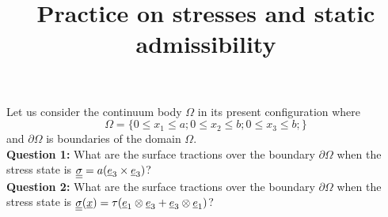 \documentclass[letter,12pt]{article}
\begin{document}
\pagestyle{fancy}

\title{\textbf{Practice on stresses and static admissibility}}
\date{}

\maketitle

\vspace{-1cm}


Let us consider the continuum body $\Omega$ in its present configuration where 
\begin{equation}
\Omega = \{ 0 \le x_1 \le a; 0 \le x_2 \le b; 0 \le x_3\le b;\}
\end{equation}
and $\partial \Omega$ is boundaries of the domain $\Omega$. \\

\noindent \textbf{Question 1:} What are the surface tractions over the boundary $\partial \Omega$ when the stress state is $\underline{\underline{\sigma}} = a (\underline{e}_3 \times \underline{e}_3)$? \\

\noindent \textbf{Question 2:} What are the surface tractions over the boundary $\partial \Omega$ when the stress state is $\underline{\underline{\sigma}} (\underline{x}) = \tau (\underline{e}_1 \otimes \underline{e}_3 + \underline{e}_3 \otimes \underline{e}_1 )$?




	 



 
\end{document}
